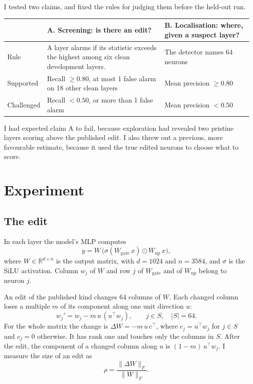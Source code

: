 \documentclass[11pt,a4paper]{article}
\newcommand{\norm}[1]{\lVert #1 \rVert}
\begin{document}
I tested two claims, and fixed the rules for judging them before the held-out run.

\begin{center}
\small
\begin{tabular}{@{}l >{\raggedright\arraybackslash}p{} >{\raggedright\arraybackslash}p{}@{}}
\toprule
 & \textbf{A. Screening: is there an edit?} & \textbf{B. Localisation: where, given a suspect layer?} \\
\midrule
Rule & A layer alarms if its statistic exceeds the highest among six clean development layers. & The detector names 64 neurons \\
\addlinespace
Supported & Recall $\ge 0.80$, at most 1 false alarm on 18 other clean layers & Mean precision $\ge 0.80$ \\
\addlinespace
Challenged & Recall $< 0.50$, or more than 1 false alarm & Mean precision $< 0.50$ \\
\bottomrule
\end{tabular}
\end{center}

I had expected claim A to fail, because exploration had revealed two pristine layers scoring above
the published edit. I also threw out a previous, more favourable estimate, because it used the true
edited neurons to choose what to score.

\section{Experiment}

\subsection{The edit}

In each layer the model's MLP computes
\[
  y = W\,\bigl(\sigma(W_{\mathrm{gate}}\,x) \odot W_{\mathrm{up}}\,x\bigr),
\]
where $W \in \mathbb{R}^{d \times n}$ is the output matrix, with $d = 1024$ and $n = 3584$, and
$\sigma$ is the SiLU activation. Column $w_j$ of $W$ and row $j$ of $W_{\mathrm{gate}}$ and of
$W_{\mathrm{up}}$ belong to neuron $j$.

An edit of the published kind changes 64 columns of $W$. Each changed column loses a multiple $m$
of its component along one unit direction $u$:
\[
  w_j' = w_j - m\,u\,(u^\top w_j), \qquad j \in S, \quad |S| = 64 .
\]
For the whole matrix the change is $\Delta W = -m\,u\,c^\top$, where $c_j = u^\top w_j$ for
$j \in S$ and $c_j = 0$ otherwise. It has rank one and touches only the columns in $S$. After the
edit, the component of a changed column along $u$ is $(1 - m)\,u^\top w_j$. I measure the size of
an edit as
\[
  \rho = \frac{\norm{\Delta W}_F}{\norm{W}_F} .
\]
\end{document}
